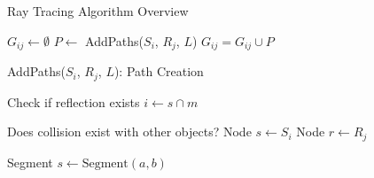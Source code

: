 \begin{algorithm}[p]
    \caption{Ray Tracing Algorithm Overview}
    \label{alg:ray}
    \begin{algorithmic}
            \State $G_{ij} \gets \emptyset$
                    \State $P \gets$ AddPaths($S_i$, $R_j$, $L$)
                    \State $G_{ij} = G_{ij} \cup P$
                    \EndIf
                \EndFor
            \EndFor
        \EndFor
    \end{algorithmic}
\end{algorithm}

\begin{algorithm}[p]
    \caption{AddPaths($S_i$, $R_j$, $L$): Path Creation}
    \label{alg:path}
    \begin{algorithmic}
        

        \State Check if reflection exists
        \State $i \gets s \cap m$
        \If{}

        \EndIf

        \State Does collision exist with other objects?
        \State Node $s \gets S_i$
        \State Node $r \gets R_j$


        \EndFor
        \State Segment $s \gets \text{Segment}(a,b)$
        \Return{}
    \end{algorithmic}
\end{algorithm}
